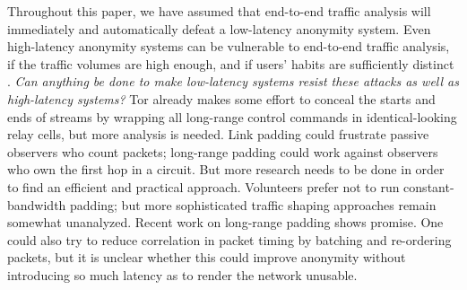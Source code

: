 \documentclass[times,10pt,twocolumn]{article}
\begin{document}
%

Throughout this paper, we have assumed that end-to-end traffic
analysis will immediately and automatically defeat a low-latency
anonymity system. Even high-latency anonymity
systems can be vulnerable to end-to-end traffic analysis, if the
traffic volumes are high enough, and if users' habits are sufficiently
distinct \cite{limits-open,statistical-disclosure}.  \emph{Can
  anything be done to make low-latency systems resist these attacks as
  well as high-latency systems?}
Tor already makes some effort to conceal the starts and
ends of streams by wrapping all long-range control commands in
identical-looking relay cells, but more analysis is needed.  Link
padding could frustrate passive observers who count packets; long-range
padding could work against observers who own the first hop in a
circuit.  But more research needs to be done in order to find an
efficient and practical approach.  Volunteers prefer not to run
constant-bandwidth padding; but more sophisticated traffic shaping
approaches remain somewhat unanalyzed. 
Recent work
on long-range padding \cite{defensive-dropping} shows promise.  One
could also try to reduce correlation in packet timing by batching and
re-ordering packets, but it is unclear whether this could improve
anonymity without introducing so much latency as to render the
network unusable.
\end{document}
